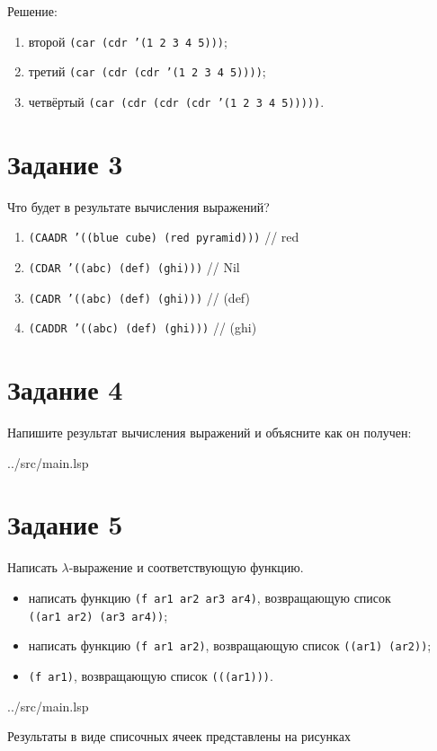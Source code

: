 Решение: 
\begin{enumerate}[label=\arabic*)]
	\item второй \texttt{(car (cdr '(1 2 3 4 5)))};
	\item третий \texttt{(car (cdr (cdr '(1 2 3 4 5))))};
	\item четвёртый \texttt{(car (cdr (cdr (cdr '(1 2 3 4 5)))))}.
\end{enumerate}

\section*{Задание 3}

Что будет в результате вычисления выражений?
\begin{enumerate}[label=\alph*)]
	\item \texttt{(CAADR '((blue cube) (red pyramid)))} // red
	\item \texttt{(CDAR '((abc) (def) (ghi)))} // Nil
	\item \texttt{(CADR '((abc) (def) (ghi)))} // (def)
	\item \texttt{(CADDR '((abc) (def) (ghi)))} // (ghi)
\end{enumerate}	

\section*{Задание 4}
Напишите результат вычисления выражений и объясните как он получен:
\begin{lstinputlisting}[
	caption={Задание 4},
	label={lst:t3},
	style={lsp},
	linerange={16-31},
	]{../src/main.lsp}
\end{lstinputlisting}

\section*{Задание 5}

Написать $\lambda$-выражение и соответствующую функцию.

\begin{itemize}[label=---]
	\item написать функцию {\texttt{(f ar1 ar2 ar3 ar4)}}, возвращающую список \\{\texttt{((ar1 ar2) (ar3 ar4))}};
	\item написать функцию {\texttt{(f ar1 ar2)}}, возвращающую список {\texttt{((ar1) (ar2))}};
	\item {\texttt{(f ar1)}}, возвращающую список {\texttt{(((ar1)))}}.
\end{itemize}


\begin{lstinputlisting}[
	caption={Задание 5},
	label={lst:t4},
	style={lsp},
	linerange={34-41},
	]{../src/main.lsp}
\end{lstinputlisting}

Результаты в виде списочных ячеек представлены на рисунках 

